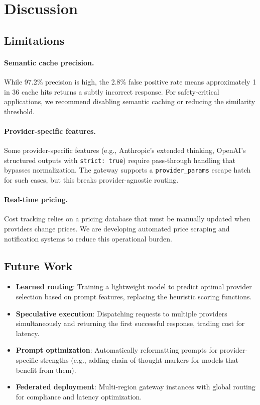 \section{Discussion}

\label{sec:discussion}

\subsection{Limitations}

\paragraph{Semantic cache precision.} While 97.2\% precision is high, the 2.8\% false positive rate means approximately 1 in 36 cache hits returns a subtly incorrect response. For safety-critical applications, we recommend disabling semantic caching or reducing the similarity threshold.

\paragraph{Provider-specific features.} Some provider-specific features (e.g., Anthropic's extended thinking, OpenAI's structured outputs with \texttt{strict: true}) require pass-through handling that bypasses normalization. The gateway supports a \texttt{provider\_params} escape hatch for such cases, but this breaks provider-agnostic routing.

\paragraph{Real-time pricing.} Cost tracking relies on a pricing database that must be manually updated when providers change prices. We are developing automated price scraping and notification systems to reduce this operational burden.

\subsection{Future Work}

\begin{itemize}[leftmargin=*]
    \item \textbf{Learned routing}: Training a lightweight model to predict optimal provider selection based on prompt features, replacing the heuristic scoring functions.
    \item \textbf{Speculative execution}: Dispatching requests to multiple providers simultaneously and returning the first successful response, trading cost for latency.
    \item \textbf{Prompt optimization}: Automatically reformatting prompts for provider-specific strengths (e.g., adding chain-of-thought markers for models that benefit from them).
    \item \textbf{Federated deployment}: Multi-region gateway instances with global routing for compliance and latency optimization.
\end{itemize}

